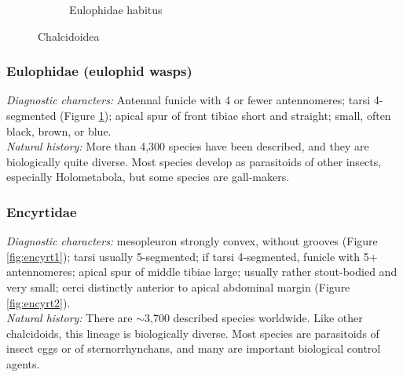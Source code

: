 \documentclass[letterpaper, 11pt]{article}
\begin{document}
\begin{figure}[ht!]
\begin{subfigure}[ht!]{0.45\textwidth}
  \caption{Eulophidae habitus \citep[][Fig. 228]{goulet1993hymenoptera}}
  \label{fig:eulophid}
\end{subfigure}
\caption{Chalcidoidea}
\label{fig:xxxxxx}
\end{figure}

\subsubsection{Eulophidae (eulophid wasps)}
\noindent{}\textit{Diagnostic characters:} Antennal funicle with 4 or fewer antennomeres; tarsi 4-segmented (Figure \ref{fig:eulophid}); apical spur of front tibiae short and straight; small, often black, brown, or blue.\\

\noindent{}\textit{Natural history:} More than 4,300 species have been described, and they are biologically quite  diverse. Most species develop as parasitoids of other insects, especially Holometabola, but some species are gall-makers.\\

\subsubsection{Encyrtidae}
\noindent{}\textit{Diagnostic characters:} mesopleuron strongly convex, without grooves (Figure \ref{fig:encyrt1}); tarsi usually 5-segmented; if tarsi 4-segmented, funicle with 5+ antennomeres; apical spur of middle tibiae large; usually rather stout-bodied and very small; cerci distinctly anterior to apical abdominal margin (Figure \ref{fig:encyrt2}).\\

\noindent{}\textit{Natural history:} There are $\sim$3,700 described species worldwide. Like other chalcidoids, this lineage is biologically diverse. Most species are parasitoids of insect eggs or  of sternorrhynchans, and many are important biological control agents.
\end{document}
